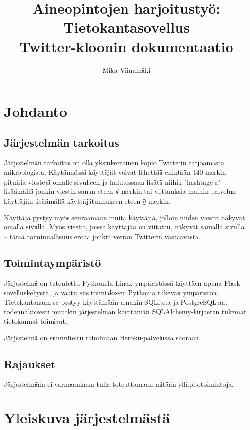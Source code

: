 \documentclass{article}
\let\stdsection\section
\renewcommand\section{\newpage\stdsection}
\begin{document}
\title{Aineopintojen harjoitustyö: Tietokantasovellus \\ Twitter-kloonin dokumentaatio}
\author{Mika Viinamäki}
\maketitle
\thispagestyle{empty}

\newpage

\tableofcontents
\newpage

\section{Johdanto}

\subsection {Järjestelmän tarkoitus}
Järjestelmän tarkoitus on olla yksinkertainen kopio Twitterin tarjoamasta mikroblogista. Käytännössä käyttäjät voivat lähettää enintään 140 merkin pituisia viestejä omalle sivulleen ja halutessaan lisätä niihin "hashtageja" lisäämällä jonkin viestin sanan eteen \verb+#+-merkin tai viittauksia muihin palvelun käyttäjiin lisäämällä käyttäjätunnuksen eteen \verb+@+-merkin.

Käyttäjä pystyy myös seuraamaan muita käyttäjiä, jolloin niiden viestit näkyvät omalla sivulla. Myös viestit, joissa käyttäjää on viitattu, näkyvät samalla sivulla -- tämä toiminnallisuus eroaa jonkin verran Twitterin vastaavasta.

\subsection{Toimintaympäristö}
Järjestelmä on toteutettu Pythonilla Linux-ympäristössä käyttäen apuna Flask-sovelluskehystä, ja vaatii siis toimiakseen Pythonia tukevan ympäristön. Tietokantanaan se pystyy käyttämään ainakin SQLite:a ja PostgreSQL:aa, todennäköisesti muutkin järjestelmän käyttämän SQLAlchemy-kirjaston tukemat tietokannat toimivat.

Järjestelmä on suunniteltu toimimaan Heroku-palvelussa suoraan.

\subsection{Rajaukset}
Järjestelmään ei varmaankaan tulla toteuttamaan mitään ylläpitotoimintoja.

\section{Yleiskuva järjestelmästä}
\end{document}

